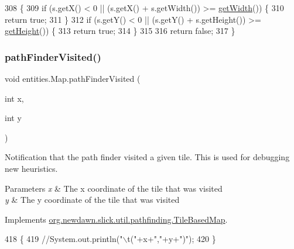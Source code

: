 \begin{DoxyCode}
308                                           \{
309         \textcolor{keywordflow}{if} (s.getX() < 0 || (s.getX() + s.getWidth()) >= \mbox{\hyperlink{classentities_1_1_map_a7c15a6b2fac91bdb2592e1db1bc78623}{getWidth}}()) \{
310             \textcolor{keywordflow}{return} \textcolor{keyword}{true};
311         \}
312         \textcolor{keywordflow}{if} (s.getY() < 0 || (s.getY() + s.getHeight()) >= \mbox{\hyperlink{classentities_1_1_map_a9ed9d1f8683c86dfca33639e252aaded}{getHeight}}()) \{
313             \textcolor{keywordflow}{return} \textcolor{keyword}{true};
314         \}
315 
316         \textcolor{keywordflow}{return} \textcolor{keyword}{false};
317     \}
\end{DoxyCode}
\mbox{\label{classentities_1_1_map_a0ad9c4406c9c9de0cfd6dfbf4acdd924}} 
\subsubsection{\texorpdfstring{path\+Finder\+Visited()}{pathFinderVisited()}}
{\footnotesize\ttfamily void entities.\+Map.\+path\+Finder\+Visited (\begin{DoxyParamCaption}\item[{int}]{x,  }\item[{int}]{y }\end{DoxyParamCaption})\hspace{0.3cm}{\ttfamily [inline]}}

Notification that the path finder visited a given tile. This is used for debugging new heuristics.


\begin{DoxyParams}{Parameters}
{\em x} & The x coordinate of the tile that was visited \\
\hline
{\em y} & The y coordinate of the tile that was visited \\
\hline
\end{DoxyParams}


Implements \mbox{\hyperlink{interfaceorg_1_1newdawn_1_1slick_1_1util_1_1pathfinding_1_1_tile_based_map_aeb1c1b5cbb0aecc4e280dbe18d5af5ac}{org.\+newdawn.\+slick.\+util.\+pathfinding.\+Tile\+Based\+Map}}.


\begin{DoxyCode}
418                                                 \{
419         \textcolor{comment}{//System.out.println("\(\backslash\)t("+x+","+y+")");}
420     \}
\end{DoxyCode}
\mbox{\label{classentities_1_1_map_a2342f9740e05311c015fdcbd07c86f11}} 
